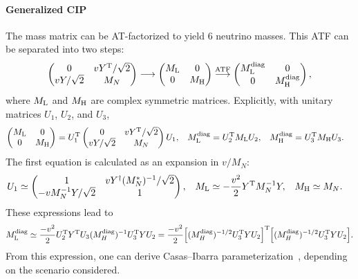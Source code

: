 \documentclass[CheatSheet]{subfiles}
\begin{document}
\paragraph{Generalized CIP}
The mass matrix can be AT-factorized to yield 6 neutrino masses.
This ATF can be separated into two steps:
\begin{equation}
 \begin{pmatrix}0 & v Y^{\mathrm{T}}/\sqrt2 \\ v Y/\sqrt2 & M_N\end{pmatrix}
\longrightarrow
\begin{pmatrix}M_{\mathrm{L}} & 0 \\ 0 & M_{\mathrm{H}}\end{pmatrix}
\stackrel{\text{ATF}}\longrightarrow
\begin{pmatrix}M_{\mathrm{L}}^{\text{diag}} & 0 \\ 0 & M_{\mathrm{H}}^{\text{diag}}\end{pmatrix},
\end{equation}
where $M_{\mathrm{L}}$ and $M_{\mathrm{H}}$ are complex symmetric matrices.
Explicitly, with unitary matrices  $U_1$, $U_2$, and $U_3$,
\begin{align}
\begin{pmatrix}M_{\mathrm{L}} & 0 \\ 0 & M_{\mathrm{H}}\end{pmatrix}
&=
 U_1^{\mathrm{T}} \begin{pmatrix}0 & v Y^{\mathrm{T}}/\sqrt2 \\ v Y/\sqrt2 & M_N\end{pmatrix} U_1,
&M_{\mathrm{L}}^\text{diag} &= U_2^{\mathrm{T}} M_{\mathrm{L}} U_2,
&M_{\mathrm{H}}^\text{diag} &= U_3^{\mathrm{T}} M_{\mathrm{H}} U_3.
\end{align}
The first equation is calculated as an expansion in $v/M_N$:
\begin{align}
 U_1  &\simeq \begin{pmatrix}1 & v Y^\dagger (M_N^*)^{-1}/\sqrt2 \\ -v M_N^{-1}Y/\sqrt2 & 1\end{pmatrix},
&M_{\mathrm{L}}&\simeq -\frac{v^2}{2}Y^{\mathrm{T}} M_N^{-1} Y,
&M_{\mathrm{H}}&\simeq M_N.
\end{align}
These expressions lead to
\begin{equation}
  M_{\mathrm{L}}^{\text{diag}}
\simeq \frac{-v^2}{2} U_2^{\mathrm{T}} Y^{\mathrm{T}} U_3(M_H^{\text{diag}})^{-1}U_3^{\mathrm{T}} YU_2
=\frac{-v^2}{2}
\Bigl[(M_H^{\text{diag}})^{-1/2}U_3^{\mathrm{T}} YU_2\Bigr]^{\mathrm{T}}
\Bigl[(M_H^{\text{diag}})^{-1/2}U_3^{\mathrm{T}} YU_2\Bigr].
\end{equation}
From this expression, one can derive Casas--Ibarra parameterization~\cite{Casas:2001sr}, depending on the scenario considered.
\end{document}
